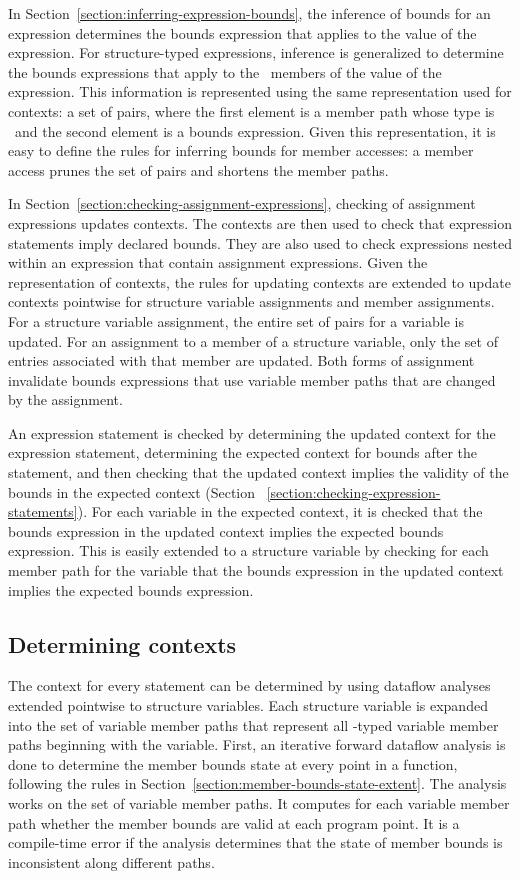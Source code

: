 In Section~\ref{section:inferring-expression-bounds}, the inference of bounds for an
expression determines the bounds expression that applies to the value of the
expression.  For structure-typed expressions, inference is generalized to determine
the bounds expressions that apply to the \arrayptr\ members of the value 
of the expression.  This information is represented using the same
representation used for contexts: a set of pairs, where the first element 
is a member path whose type is \arrayptr\ and the second element is a 
bounds expression.  Given this representation, it is easy to define
the rules for inferring bounds for member accesses: a member access prunes the
set of pairs and shortens the member paths.

In Section~\ref{section:checking-assignment-expressions}, checking of assignment
expressions updates contexts.  The contexts are then used to check that expression
statements imply declared bounds.  They are also used to check expressions nested
within an expression that contain assignment expressions. 
Given the representation of contexts, the rules for updating contexts
are extended to update contexts pointwise for structure variable assignments and member 
assignments.  For a structure variable assignment, the entire set of pairs for a
variable is updated.  For an assignment to a member of a  structure variable,
only the set of entries  associated with that member are updated.  Both forms of assignment
invalidate bounds expressions that use variable member paths that are changed by the
assignment.

An expression statement is checked by determining the updated context for the
expression statement, determining the expected context for bounds after 
the statement, and then checking that the updated context implies the
validity of the bounds in the expected context (Section ~\ref{section:checking-expression-statements}).
For each variable in the expected context, it is checked that the bounds expression in
the updated context implies the expected bounds expression.  This is easily 
extended to a structure variable by checking for each member path for 
the variable that the bounds expression in the updated context implies
the expected bounds expression.

\subsection{Determining contexts}

The context for every statement can be determined by using dataflow analyses extended
pointwise to structure variables.  Each structure variable is expanded into the set
of variable member paths that represent all \arrayptr-typed variable member paths beginning
with the variable.  First, an iterative forward dataflow analysis is done to determine the
member bounds state at every point in a function, following the rules in
Section~\ref{section:member-bounds-state-extent}.  The analysis works on the set of variable
member paths.   It computes for each variable member path whether the member bounds are valid 
at each program point.  It is a compile-time error if the analysis determines that the state of
member bounds is inconsistent along different paths.

